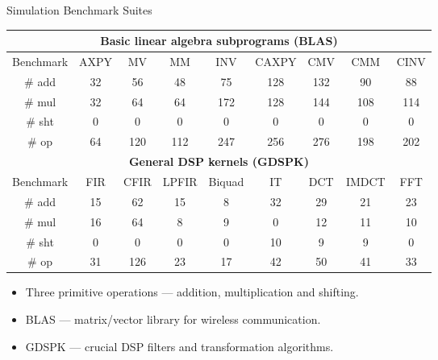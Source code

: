 \documentclass[handout]{beamer}
\begin{document}
\begin{CJK}{UTF8}{bkai}
            \begin{frame}{Simulation Benchmark Suites}
                \begin{table}[!ht]
                    \centering
                    \resizebox{\columnwidth}{!}
                    {
                        \begin{tabular}{|c|c|c|c|c|c|c|c|c|}
                            \hline
                            \multicolumn{9}{|c|}{\textbf{Basic linear algebra subprograms (BLAS)}} \\ \hline
                            Benchmark              & AXPY   & MV     & MM      & INV      & CAXPY  & CMV  & CMM    & CINV  \\ \hline
                            \# add            &  32    &  56    &   48    &    75    &  128   & 132  &   90   &  88   \\ \hline
                            \# mul            &  32    &  64    &   64    &   172    &  128   & 144  &  108   & 114   \\ \hline
                            \# sht            &   0    &   0    &    0    &     0    &    0   &   0  &    0   &   0   \\ \hline
                            \# op             &  64    & 120    &  112    &   247    &  256   & 276  &  198   & 202   \\ \hline
                            \multicolumn{9}{|c|}{\textbf{General DSP kernels (GDSPK)}}                     \\ \hline
                            Benchmark              & FIR    & CFIR   & LPFIR   & Biquad   & IT     & DCT  & IMDCT  & FFT   \\ \hline
                            \# add            & 15     &  62    &   15    &    8     &  32    &  29  &   21   &  23   \\ \hline
                            \# mul            & 16     &  64    &    8    &    9     &   0    &  12  &   11   &  10   \\ \hline
                            \# sht            &  0     &   0    &    0    &    0     &  10    &   9  &    9   &   0   \\ \hline
                            \# op             & 31     & 126    &   23    &   17     &  42    &  50  &   41   &  33   \\ \hline
                        \end{tabular}
                    }
                \end{table}
                \begin{itemize}
                    \pause
                    \item Three primitive operations --- addition, multiplication and shifting.
                    \pause
                    \item BLAS --- matrix/vector library for wireless communication.
                    \pause
                    \item GDSPK --- crucial DSP filters and transformation algorithms.
                \end{itemize}
            \end{frame}


\end{CJK}
\end{document}
